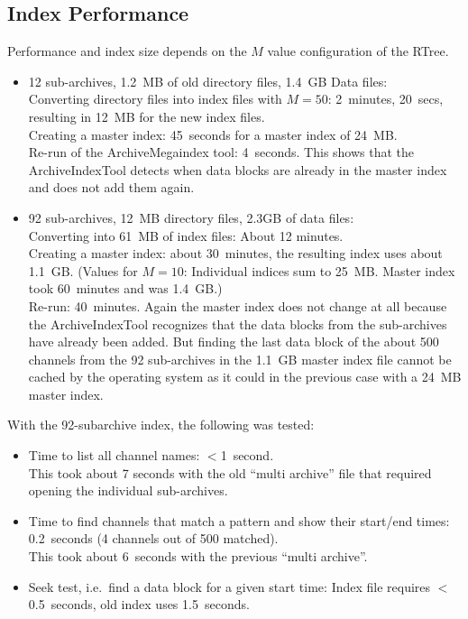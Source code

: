 \subsection{Index Performance}
Performance and index size depends on the $M$ value configuration of
the RTree.
\begin{itemize}
\item 12 sub-archives, 1.2~MB of old directory files, 1.4~GB Data
      files:\\
      Converting directory files into index files with $M=50$:
      2~minutes, 20~secs, resulting in 12~MB for the new index files.\\
      Creating a master index: 45~seconds for a master index of 24~MB.\\
      Re-run of the ArchiveMegaindex tool: 4~seconds.
      This shows that the ArchiveIndexTool detects when data blocks
      are already in the master index and does not add them again.
\item 92 sub-archives, 12~MB directory files, 2.3GB of data files:\\
      Converting into 61~MB of index files: About 12 minutes.\\
      Creating a master index: about 30~minutes, the resulting
      index uses about 1.1~GB.
      (Values for $M=10$: Individual indices sum to 25~MB. Master
      index took 60~minutes and was 1.4~GB.)\\
      Re-run: 40~minutes. Again the master index does not change at
      all because the ArchiveIndexTool recognizes that the data blocks
      from the sub-archives have already been added. But finding the
      last data block of the about 500 channels from the 92
      sub-archives in the 1.1~GB master index file cannot be cached by
      the operating system as it could in the previous case with a
      24~MB master index.
\end{itemize}

\noindent With the 92-subarchive index, the following was tested:
\begin{itemize}
\item Time to list all channel names: $<$1~second.\\
      This took about 7 seconds with the old ``multi archive'' file
      that required opening the individual sub-archives.
\item Time to find channels that match a pattern and show their
      start/end times: 0.2~seconds (4 channels out of 500 matched).\\
      This took about 6~seconds with the previous ``multi archive''.
\item Seek test, i.e.\ find a data block for a given start time:
      Index file requires $<$0.5~seconds, old index uses 1.5~seconds.
\end{itemize}

